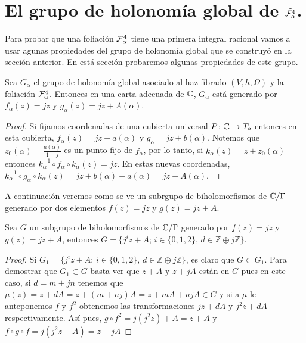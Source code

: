 \section{El grupo de holonomía global de $\tilde{\mathcal{F}_{\alpha}^{4}}$.}

Para probar que una foliación $\mathcal{F}_{\alpha}^{4}$ tiene una primera integral racional vamos a usar agunas propiedades del grupo de holonomía global que se construyó en la sección anterior. En está sección probaremos algunas propiedades de este grupo. 

\begin{Lema}
\label{Prop:GrupoHolonomia}
Sea $G_{\alpha}$ el grupo de holonomía global asociado al haz fibrado $(V,h,\Omega)$ y la foliación $\tilde{\mathcal{F}_{\alpha}^{4}}$. Entonces en una carta adecuada de $\mathbb{C}$, $G_{\alpha}$ está generado por $f_{\alpha}(z)=jz$ y $g_{\alpha}(z)=jz+A(\alpha)$.
\end{Lema}
\begin{proof}
Si fijamos coordenadas de una cubierta universal $P\colon \mathbb{C}\rightarrow T_{a}$ entonces en esta cubierta, $f_{\alpha}(z)=jz+a(\alpha)$ y $g_{\alpha}=jz+b(\alpha)$. Notemos que $z_{0}(\alpha)=\tfrac{a(\alpha)}{1-j}$ es un punto fijo de $f_{\alpha}$, por lo tanto, si $k_{\alpha}(z)=z+z_{0}(\alpha)$ entonces $k_{\alpha}^{-1}\circ f_{\alpha}\circ k_{\alpha}(z)=jz$. En estas nuevas coordenadas, $k_{\alpha}^{-1}\circ g_{\alpha}\circ k_{\alpha}(z)=jz+b(\alpha)-a(\alpha)=jz+A(\alpha)$. 
\end{proof}

A continuación veremos como se ve un subrgupo de biholomorfismos de $\mathbb{C}/\Gamma$ generado por dos elementos $f(z)=jz$ y $g(z)=jz+A$.

\begin{Proposicion}
\label{Prop:DescripcionDelGrupo}
Sea $G$ un subgrupo de biholomorfismos de $\mathbb{C}/\Gamma$ generado por $f(z)=jz$ y $g(z)=jz+A$, entonces $G=\{j^{i}z+A;\, i\in\{0,1,2\},\, d\in\mathbb{Z}\oplus j\mathbb{Z} \}$.
\end{Proposicion}
\begin{proof}
Si $G_{1}=\{j^{i}z+A;\, i\in\{0,1,2\},\, d\in\mathbb{Z}\oplus j\mathbb{Z} \}$, es claro que $G\subset G_{1}$. Para demostrar que $G_{1}\subset G$ basta ver que $z+A$ y $z+jA$ están en $G$ pues en este caso, si $d=m+jn$ tenemos que $\mu(z)=z+dA=z+(m+nj)A=z+mA+njA\in G$ y si a $\mu$ le anteponemos $f$ y $f^{2}$ obtenemos las transformaciones $jz+dA$ y $j^{2}z+dA$ respectivamente. Así pues, $g\circ f^{2}=j(j^{2}z)+A=z+A$ y $f\circ g\circ f=j(j^{2}z+A)=z+jA$
\end{proof}

